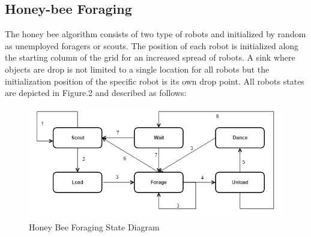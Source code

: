 \documentclass[12pt]{article}
\begin{document}
\subsection{Honey-bee Foraging}

\par{The honey bee algorithm consists of two type of robots and initialized by random as unemployed foragers or scouts. The position of each robot is initialized along the starting column of the grid for an increased spread of robots. A sink where objects are drop is not limited to a single location for all robots but the initialization position of the specific robot is its own drop point. All robots states are depicted in Figure.2 and described as follows:}

\begin{figure}[h]
\includegraphics[width=\textwidth]{honeybee.png}
\centering
\caption{Honey Bee Foraging State Diagram}
\label{fig:honeyBeeState}
\end{figure}
\end{document}
